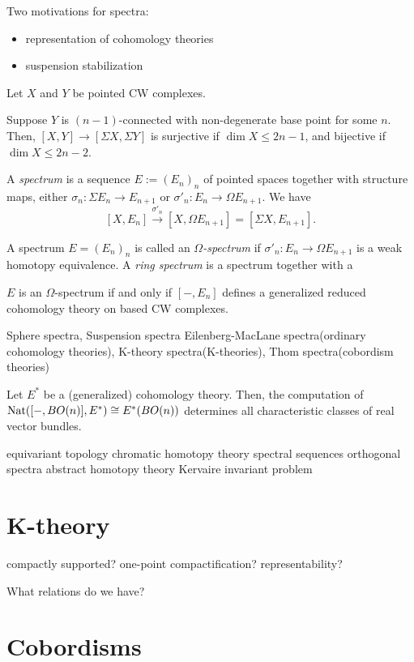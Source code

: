 \documentclass{../../large}
\begin{document}
Two motivations for spectra:
\begin{itemize}
\item representation of cohomology theories
\item suspension stabilization
\end{itemize}


\begin{prb}
Let $X$ and $Y$ be pointed CW complexes.
\begin{parts}
\item Suppose $Y$ is $(n-1)$-connected with non-degenerate base point for some $n$. Then, $[X,Y]\to[\Sigma X,\Sigma Y]$ is surjective if $\dim X\le 2n-1$, and bijective if $\dim X\le2n-2$.
\end{parts}
\end{prb}



\begin{prb}
A \emph{spectrum} is a sequence $E:=(E_n)_n$ of pointed spaces together with structure maps, either $\sigma_n:\Sigma E_n\to E_{n+1}$ or $\sigma'_n:E_n\to\Omega E_{n+1}$.
We have
\[[X,E_n]\xrightarrow{\sigma'_n}[X,\Omega E_{n+1}]=[\Sigma X,E_{n+1}].\]
\end{prb}

\begin{prb}
A spectrum $E=(E_n)_n$ is called an \emph{$\Omega$-spectrum} if $\sigma'_n:E_n\to\Omega E_{n+1}$ is a weak homotopy equivalence.
A \emph{ring spectrum} is a spectrum together with a 
\begin{parts}
\item $E$ is an $\Omega$-spectrum if and only if $[-,E_n]$ defines a generalized reduced cohomology theory on based CW complexes.
\end{parts}
\end{prb}




Sphere spectra, Suspension spectra
Eilenberg-MacLane spectra(ordinary cohomology theories), K-theory spectra(K-theories), Thom spectra(cobordism theories)



Let $E^*$ be a (generalized) cohomology theory.
Then, the computation of $\operatorname{Nat}([-,BO(n)],E^*)\cong E^*(BO(n))$ determines all characteristic classes of real vector bundles.




equivariant topology
chromatic homotopy theory
spectral sequences
orthogonal spectra
abstract homotopy theory
Kervaire invariant problem






\chapter{K-theory}


\begin{prb}
compactly supported?
one-point compactification?
representability?

What relations do we have?
\end{prb}

\chapter{Cobordisms}
\end{document}
